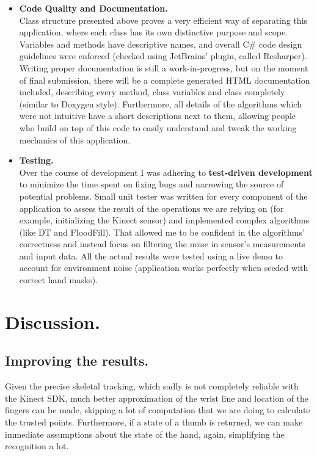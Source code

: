 \documentclass[a4paper,11pt,oneside]{article}
\begin{document}
\begin{itemize}
  \item \textbf{Code Quality and Documentation.} \\
Class structure presented above proves a very efficient way of separating this application, where each class has its own distinctive purpose and scope. Variables and methods have descriptive names, and overall C\# code design guidelines were enforced (checked using JetBrains' plugin, called Resharper).\\
Writing proper documentation is still a work-in-progress, but on the moment of final submission, there will be a complete generated HTML documentation included, describing every method, class variables and class completely (similar to Doxygen style). Furthermore, all details of the algorithms which were not intuitive have a short descriptions next to them, allowing people who build on top of this code to easily understand and tweak the working mechanics of this application.

  \item \textbf{Testing.}\\ 
Over the course of development I was adhering to \textbf{test-driven development} to minimize the time spent on fixing bugs and narrowing the source of potential problems. Small unit tester was written for every component of the application to assess the result of the operations we are relying on (for example, initializing the Kinect sensor) and implemented complex algorithms (like DT and FloodFill). That allowed me to be confident in the algorithms' correctness and instead focus on filtering the noise in sensor's measurements and input data. All the actual results were tested using a live demo to account for environment noise (application works perfectly when seeded with correct hand masks). 

  \end{itemize}

\section{Discussion.}

\subsection{Improving the results.}
Given the precise skeletal tracking, which sadly is not completely reliable with the Kinect SDK, much better approximation of the wrist line and location of the fingers can be made, skipping a lot of computation that we are doing to calculate the trusted points. Furthermore, if a state of a thumb is returned, we can make immediate assumptions about the state of the hand, again, simplifying the recognition a lot.
\end{document}
